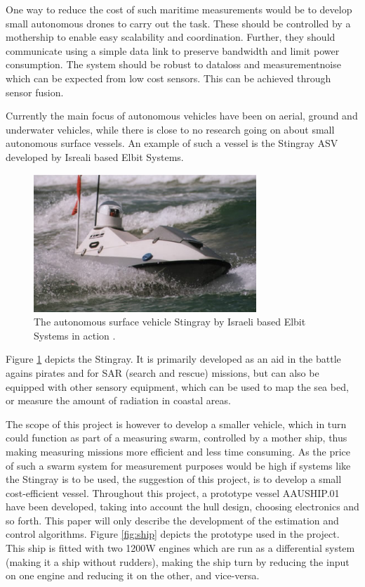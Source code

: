 \documentclass[journal]{IEEEtran}
\begin{document}
One way to reduce the cost of such maritime measurements would be to develop small autonomous drones to carry out the task. These should be controlled by a mothership to enable easy scalability and coordination. Further, they should communicate using a simple data link to preserve bandwidth and limit power consumption. The system should be robust to dataloss and measurementnoise which can be expected from low cost sensors. This can be achieved through sensor fusion.

Currently the main focus of autonomous vehicles have been on aerial, ground and underwater vehicles, while there is close to no research going on about small autonomous surface vessels. An example of such a vessel is the Stingray ASV developed by Isreali based Elbit Systems. 
\begin{figure}
	\begin{center}
		\includegraphics[width=8.4cm]{img/stingray.jpg} %
		\caption{The autonomous surface vehicle Stingray by Israeli based Elbit Systems in action \cite{defense}.}  
		\label{fig:stingray}
	\end{center}
\end{figure}

Figure \ref{fig:stingray} depicts the Stingray. It is primarily developed as an aid in the battle agains pirates and for SAR (search and rescue) missions, but can also be equipped with other sensory equipment, which can be used to map the sea bed, or measure the amount of radiation in coastal areas. 

The scope of this project is however to develop a smaller vehicle, which in turn could function as part of a measuring swarm, controlled by a mother ship, thus making measuring missions more efficient and less time consuming. As the price of such a swarm system for measurement purposes would be high if systems like the Stingray is to be used, the suggestion of this project, is to develop a small cost-efficient vessel. Throughout this project, a prototype vessel AAUSHIP.01 have been developed, taking into account the hull design, choosing electronics and so forth. This paper will only describe the development of the estimation and control algorithms. Figure \ref{fig:ship} depicts the prototype used in the project. This ship is fitted with two 1200W engines which are run as a differential system (making it a ship without rudders), making the ship turn by reducing the input on one engine and reducing it on the other, and vice-versa. 
\end{document}
